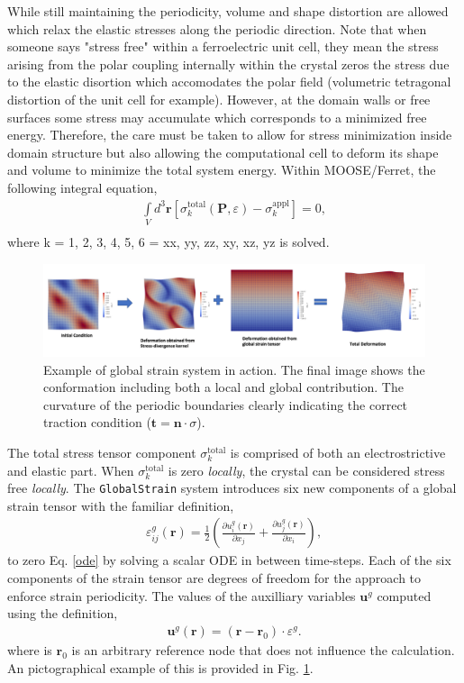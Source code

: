 \documentclass[paper=a4,14pt]{scrartcl} %
\begin{document}
%
While still maintaining the periodicity, volume and shape distortion are allowed which relax the elastic stresses along the periodic direction. 
%
Note that when someone says "stress free" within a ferroelectric unit cell, they mean the stress arising from the polar coupling internally within the crystal zeros the stress due to the elastic disortion which accomodates the polar field (volumetric tetragonal distortion of the unit cell for example).
%
However, at the domain walls or free surfaces some stress may accumulate which corresponds to a minimized free energy. 
%
Therefore, the care must be taken to allow for stress minimization inside domain structure but also allowing the computational cell to deform its shape and volume to minimize the total system energy.
%
Within MOOSE/Ferret, the following integral equation,
%
\begin{align}\label{ode}
\int\limits_V d^3\textbf{r} \left[\sigma_{k}^\mathrm{total}(\textbf{P},\varepsilon) - \sigma_{k}^\mathrm{appl} \right] = 0, \\ \nonumber
\end{align}
%
where k = 1, 2, 3, 4, 5, 6 = xx, yy, zz, xy, xz, yz is solved. 
%
\begin{figure}[h]\centering
\includegraphics[width=19cm]{example_horizontal.png}\caption{Example of global strain system in action. The final image shows the conformation including both a local and global contribution. The curvature of the periodic boundaries clearly indicating the correct traction condition ($\textbf{t} = \textbf{n}\cdot \sigma$).}\label{fig2}
\end{figure}
%
The total stress tensor component $\sigma_{k}^\mathrm{total}$ is comprised of both an electrostrictive and elastic part. When $\sigma_{k}^\mathrm{total}$ is zero \emph{locally}, the crystal can be considered stress free \emph{locally}.
%
The \texttt{GlobalStrain} system introduces six new components of a global strain tensor with the familiar definition,
%
\begin{align}
\varepsilon_{ij}^g(\textbf{r}) = \frac{1}{2}\left(\frac{\partial u_i^g(\textbf{r})}{\partial x_j}+\frac{\partial u_j^g(\textbf{r})}{\partial x_i}\right),
\end{align}
%
to zero Eq. \ref{ode} by solving a scalar ODE in between time-steps.
%
Each of the six components of the strain tensor are degrees of freedom for the approach to enforce strain periodicity. The values of the auxilliary variables $\textbf{u}^g$ computed using the definition,
%
\begin{align}
\textbf{u}^g(\textbf{r}) = (\textbf{r} - \textbf{r}_0)\cdot\varepsilon^g.
\end{align}
%
where is $\textbf{r}_0$ is an arbitrary reference node that does not influence the calculation. An pictographical example of this is provided in Fig. \ref{fig2}.
\end{document}
